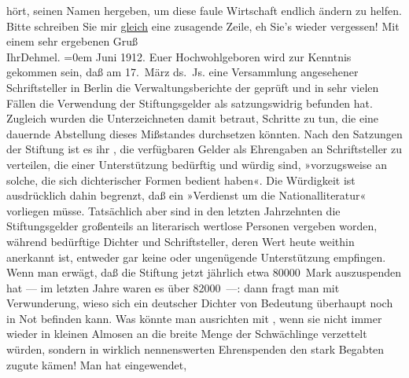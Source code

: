 \begin{ledgroupsized}[t]{13cm}
                    hört, seinen Namen hergeben, um diese faule Wirtschaft endlich ändern zu helfen.
                    Bitte schreiben Sie mir \uline{gleich} eine zusagende
                    Zeile, eh Sie’s wieder vergessen! \pend
           \pstart
           Mit einem sehr ergebenen Gruß{\\[\baselineskip]}Ihr\spacefill\mbox{Dehmel.}\pend
           \leftskip=0em{}{\bigskip}\pstart
           \raggedleft{}{\pb}Juni
                        1912.\pend
           \pstart{}Euer Hochwohlgeboren\pend\pstart
           wird zur Kenntnis gekommen sein, daß am 17. März ds. Js.
                    eine Versammlung angesehener Schriftsteller in Berlin die Verwaltungsberichte der  geprüft und in
                    sehr vielen Fällen die Verwendung der Stiftungsgelder als satzungswidrig
                    befunden hat. Zugleich wurden die Unterzeichneten damit betraut, Schritte zu
                    tun, die eine dauernde Abstellung dieses Mißstandes durchsetzen könnten.\pend
           \pstart
           Nach den Satzungen der Stiftung ist es ihr ,
                    die verfügbaren Gelder als Ehrengaben an Schriftsteller zu verteilen, die einer
                    Unterstützung bedürftig und würdig sind, »vorzugsweise an solche, die sich
                    dichterischer Formen bedient haben«. Die Würdigkeit ist ausdrücklich dahin
                    begrenzt, daß ein »Verdienst um die Nationalliteratur« vorliegen müsse.
                    Tatsächlich aber sind in den letzten Jahrzehnten die Stiftungsgelder großenteils
                    an literarisch wertlose Personen vergeben worden, während bedürftige Dichter und
                    Schriftsteller, deren Wert heute weithin anerkannt ist, entweder gar keine oder
                    ungenügende Unterstützung empfingen.\pend
           \pstart
           Wenn man erwägt, daß die Stiftung jetzt jährlich etwa 80000 Mark
                    auszuspenden hat — im letzten Jahre waren es über 82000 —: dann fragt man
                    mit Verwunderung, wieso sich ein deutscher Dichter von Bedeutung überhaupt noch
                    in Not befinden kann. Was könnte man ausrichten mit , wenn sie nicht immer wieder in kleinen Almosen an
                    die breite Menge der Schwächlinge verzettelt würden, sondern in wirklich
                    nennenswerten Ehrenspenden den stark Begabten zugute kämen! Man hat eingewendet,

\end{ledgroupsized}
